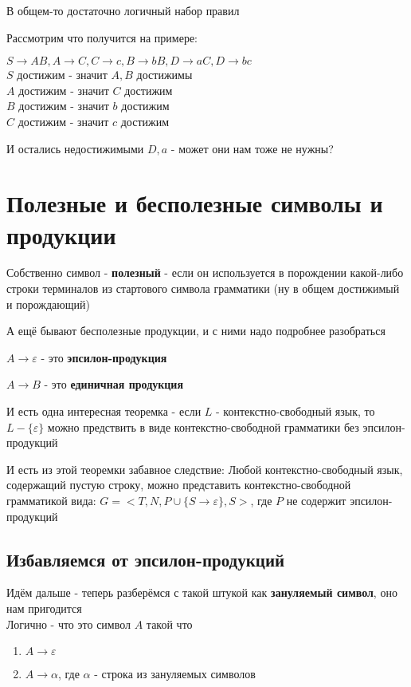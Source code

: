 \documentclass{article}
\begin{document}
В общем-то достаточно логичный набор правил

Рассмотрим что получится на примере:
\begin{center}
$ S \to AB, A \to C, C \to c, B \to bB, D \to aC, D \to bc$\\
$S$ достижим - значит $A, B$ достижимы\\
$A$ достижим - значит $C$ достижим\\
$B$ достижим - значит $b$ достижим\\
$C$ достижим - значит $c$ достижим\\
\end{center}

И остались недостижимыми $D, a$ - может они нам тоже не нужны?




\section{Полезные и бесполезные символы и продукции}
Собственно символ - \textbf{полезный} - если он используется в порождении какой-либо строки терминалов из стартового символа грамматики (ну в общем достижимый и порождающий)

А ещё бывают бесполезные продукции, и с ними надо подробнее разобраться

$A \to \varepsilon$ - это \textbf{эпсилон-продукция}

$A \to B$ - это \textbf{единичная продукция}

И есть одна интересная теоремка - если $L$ - контекстно-свободный язык, то $L - \{\varepsilon\}$ можно предствить в виде контекстно-свободной грамматики без эпсилон-продукций 

И есть из этой теоремки забавное следствие: Любой контекстно-свободный язык, содержащий пустую строку, можно представить контекстно-свободной грамматикой вида: 
$ G = <T, N, P \cup \{S\to \varepsilon \}, S>$, где $P$ не содержит эпсилон-продукций

\subsection{Избавляемся от эпсилон-продукций}
Идём дальше - теперь разберёмся с такой штукой как \textbf{зануляемый символ}, оно нам пригодится\\
Логично - что это символ $A$ такой что 
\begin{enumerate}
  \item $A \to \varepsilon$
    \item $A \to \alpha$, где $\alpha$ - строка из зануляемых символов
\end{enumerate}
\end{document}
